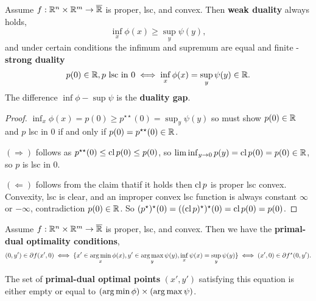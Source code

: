 \begin{thm}
  \label{sec:duality-optimization-4}
  Assume $f: \mathbb{R}^{n} \times \mathbb{R}^{m} \rightarrow \overline {\mathbb{R}}$ is proper,
  lsc, and convex. Then \textbf{weak duality} always holds,
  \begin{equation}
    \label{eq:40}
    \inf_{x} \phi(x) \geq \sup_{y} \psi(y),
  \end{equation} and under certain conditions the infimum and supremum
  are equal and finite - \textbf{strong duality}
  \begin{equation}
    \label{eq:41}
    p(0) \in \mathbb{R}, \text{$p$ lsc in $0$} \iff \inf_{x} \phi(x) =
    \sup_{y} \psi(y) \in \mathbb{R}.
  \end{equation}
  The difference $\inf \phi - \sup \psi$ is the \textbf{duality gap}.
\end{thm}

\begin{proof}
  $\inf_{x} \phi(x) = p(0) \geq p^{\star \star}(0) = \sup_{y} \psi(y)$
  so must show $p(0) \in \mathbb{R}$ and $p$ lsc in $0$ if and only if $p(0) =
  p^{\star \star}(0) \in \mathbb{R}$.

  $(\Rightarrow)$ follows as $p^{\star \star}(0) \leq \operatorname*{cl} p(0) \leq
  p(0)$, so $\liminf_{y \rightarrow 0} p(y) = \operatorname*{cl} p(0) = p(0) \in \mathbb{R}$,
  so $p$ is lsc in $0$.

  $(\Leftarrow)$ follows from the claim thatif it holds then $\operatorname*{cl} p$
  is proper lsc convex.  Convexity, lsc is clear, and an improper
  convex lsc function is always constant $\infty$ or $-\infty$,
  contradiction $p(0) \in \mathbb{R}$. So $(p^{\star})^{\star}(0) = ((\operatorname*{cl}
  p)^{\star})^{\star}(0) = \operatorname*{cl} p(0) = p(0)$.
\end{proof}

\begin{thm}
  \label{sec:duality-optimization-5}
  Assume $f: \mathbb{R}^{n} \times \mathbb{R}^{m} \rightarrow \overline {\mathbb{R}}$ is proper,
  lsc, and convex.  Then we have the \textbf{primal-dual optimality
    conditions},
  \begin{align}
    \label{eq:42}
    (0, y') \in \partial f(x', 0) \iff \{ x' \in \operatorname*{arg\,min}_{x} \phi(x),
    y' \in \operatorname*{arg\,max}_{y} \psi(y), \inf_{x} \psi(x) = \sup_{y} \psi(y) \}
    \iff (x', 0) \in \partial f^{\star}(0, y').
  \end{align}

  The set of \textbf{primal-dual optimal points} $(x', y')$ satisfying
  this equation is either empty or equal to $(\operatorname*{arg\,min} \phi) \times
  (\operatorname*{arg\,max} \psi)$.
\end{thm}

